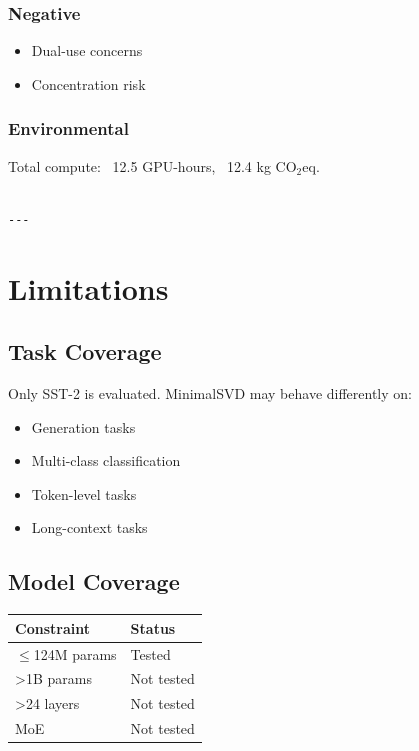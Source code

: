 \subsubsection{Negative}
\begin{itemize}
\item Dual-use concerns
\item Concentration risk

\end{itemize}
\subsubsection{Environmental}
Total compute: ~12.5 GPU-hours, ~12.4 kg CO$_2$eq.
\begin{lstlisting}

---
\end{lstlisting}


\section{Limitations}

\subsection{Task Coverage}

Only SST-2 is evaluated. MinimalSVD may behave differently on:
\begin{itemize}
\item Generation tasks
\item Multi-class classification
\item Token-level tasks
\item Long-context tasks

\end{itemize}
\subsection{Model Coverage}

\begin{table}[H]
\centering
\small
\begin{tabular}{ll}
\toprule
\textbf{Constraint} & \textbf{Status} \\
\midrule
$\le$124M params & Tested \\
>1B params & Not tested \\
>24 layers & Not tested \\
MoE & Not tested \\
\bottomrule
\end{tabular}
\end{table}

